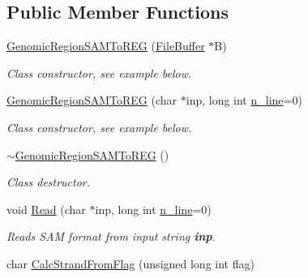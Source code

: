 \subsection*{Public Member Functions}
\begin{CompactItemize}
\item 
\hypertarget{classGenomicRegionSAMToREG_67555a42a7bba86d7e0389a09d1e3407}{
\hyperlink{classGenomicRegionSAMToREG_67555a42a7bba86d7e0389a09d1e3407}{GenomicRegionSAMToREG} (\hyperlink{classFileBuffer}{FileBuffer} $\ast$B)}
\label{classGenomicRegionSAMToREG_67555a42a7bba86d7e0389a09d1e3407}

\begin{CompactList}\small\item\em Class constructor, see example below. \item\end{CompactList}\item 
\hypertarget{classGenomicRegionSAMToREG_d29083be26f4117ba4af3f265716b9ad}{
\hyperlink{classGenomicRegionSAMToREG_d29083be26f4117ba4af3f265716b9ad}{GenomicRegionSAMToREG} (char $\ast$inp, long int \hyperlink{classGenomicRegion_efe2255aeed5338060190ded05cb9c0c}{n\_\-line}=0)}
\label{classGenomicRegionSAMToREG_d29083be26f4117ba4af3f265716b9ad}

\begin{CompactList}\small\item\em Class constructor, see example below. \item\end{CompactList}\item 
\hypertarget{classGenomicRegionSAMToREG_19dea1653efdc013f4425a43470eab02}{
\hyperlink{classGenomicRegionSAMToREG_19dea1653efdc013f4425a43470eab02}{$\sim$GenomicRegionSAMToREG} ()}
\label{classGenomicRegionSAMToREG_19dea1653efdc013f4425a43470eab02}

\begin{CompactList}\small\item\em Class destructor. \item\end{CompactList}\item 
\hypertarget{classGenomicRegionSAMToREG_b4a3b874cafac1537a7d7287cae39e76}{
void \hyperlink{classGenomicRegionSAMToREG_b4a3b874cafac1537a7d7287cae39e76}{Read} (char $\ast$inp, long int \hyperlink{classGenomicRegion_efe2255aeed5338060190ded05cb9c0c}{n\_\-line}=0)}
\label{classGenomicRegionSAMToREG_b4a3b874cafac1537a7d7287cae39e76}

\begin{CompactList}\small\item\em Reads SAM format from input string {\bf inp}. \item\end{CompactList}\item 
\hypertarget{classGenomicRegionSAMToREG_cc2044e03dc7e75bdcada1eb1e77a5ea}{
char \hyperlink{classGenomicRegionSAMToREG_cc2044e03dc7e75bdcada1eb1e77a5ea}{CalcStrandFromFlag} (unsigned long int flag)}
\label{classGenomicRegionSAMToREG_cc2044e03dc7e75bdcada1eb1e77a5ea}


\end{CompactItemize}
